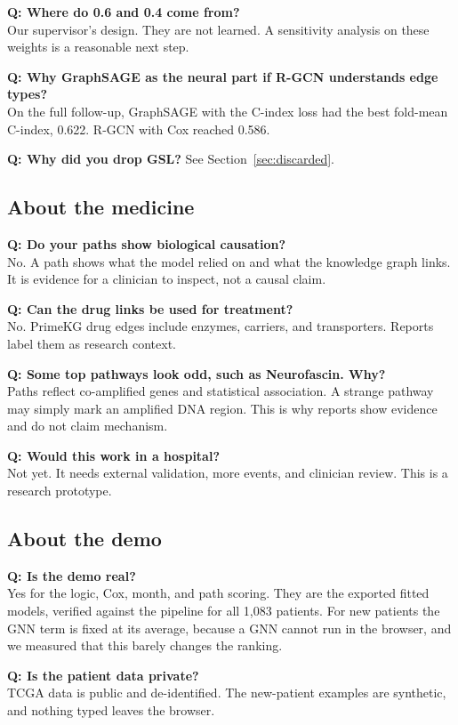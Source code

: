 \documentclass[11pt,a4paper]{article}
\begin{document}
\textbf{Q: Where do 0.6 and 0.4 come from?}\\
Our supervisor's design. They are not learned. A sensitivity analysis on these weights is a reasonable next step.

\textbf{Q: Why GraphSAGE as the neural part if R-GCN understands edge types?}\\
On the full follow-up, GraphSAGE with the C-index loss had the best fold-mean C-index, 0.622. R-GCN with Cox reached 0.586.

\textbf{Q: Why did you drop GSL?} See Section~\ref{sec:discarded}.

\subsection{About the medicine}
\textbf{Q: Do your paths show biological causation?}\\
No. A path shows what the model relied on and what the knowledge graph links. It is evidence for a clinician to inspect, not a causal claim.

\textbf{Q: Can the drug links be used for treatment?}\\
No. PrimeKG drug edges include enzymes, carriers, and transporters. Reports label them as research context.

\textbf{Q: Some top pathways look odd, such as Neurofascin. Why?}\\
Paths reflect co-amplified genes and statistical association. A strange pathway may simply mark an amplified DNA region. This is why reports show evidence and do not claim mechanism.

\textbf{Q: Would this work in a hospital?}\\
Not yet. It needs external validation, more events, and clinician review. This is a research prototype.

\subsection{About the demo}
\textbf{Q: Is the demo real?}\\
Yes for the logic, Cox, month, and path scoring. They are the exported fitted models, verified against the pipeline for all 1,083 patients. For new patients the GNN term is fixed at its average, because a GNN cannot run in the browser, and we measured that this barely changes the ranking.

\textbf{Q: Is the patient data private?}\\
TCGA data is public and de-identified. The new-patient examples are synthetic, and nothing typed leaves the browser.
\end{document}
